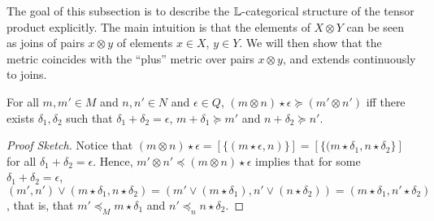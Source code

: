 % 
%
%
%
%
The goal of this subsection is to describe the $\mathbb{L}$-categorical structure of the tensor product explicitly. The main intuition is that the elements of $X\otimes Y$ can be seen as joins of pairs $x\otimes y$ of elements $x\in X$, $y\in Y$. We will then show that the metric coincides with the ``plus'' metric over pairs $x\otimes y$, and extends continuously to joins. 


\begin{lemma}\label{lemma:tensorsum}
For all $m,m'\in M$ and $n,n'\in N$ and $\epsilon \in Q$, 
$(m\otimes n)\star \epsilon \succeq (m'\otimes n')$ iff there exists $\delta_{1},\delta_{2}$ such that $\delta_{1}+\delta_{2}=\epsilon$, 
$m+\delta_{1}\succeq m'$ and $n+\delta_{2}\succeq n'$.
\end{lemma}
\begin{proof}[Proof Sketch]
Notice that $(m\otimes n)\star \epsilon = [\{(m\star \epsilon,n)\}]=
[\{(m\star \delta_{1},n\star \delta_{2}\}]$ for all $\delta_{1}+\delta_{2}=\epsilon$. 
Hence, $m'\otimes n' \preceq (m\otimes n)\star \epsilon$ implies that 
for some $\delta_{1}+\delta_{2}=\epsilon$, 
$(m',n')\vee (m\star\delta_{1},n\star\delta_{2}) = (m'\vee (m\star\delta_{1}), n'\vee (n\star\delta_{2}))= (m\star \delta_{1}, n'\star\delta_{2})$, that is, that $m'\preceq_{M} m\star \delta_{1}$ and $n'\preceq_{n}n\star \delta_{2}$. 
\end{proof}


